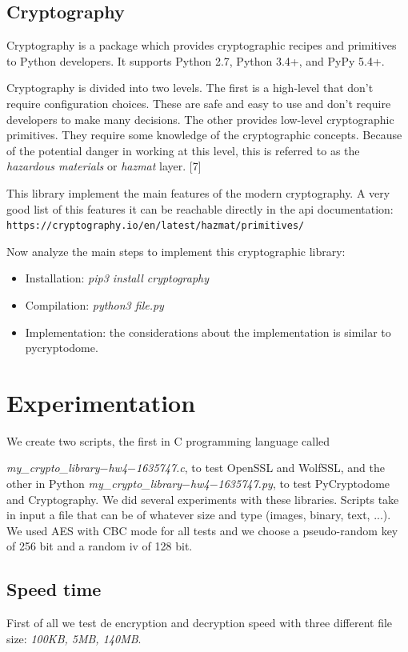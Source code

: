 \documentclass[11pt]{article}
\begin{document}
\subsection{Cryptography}
Cryptography is a package which provides cryptographic recipes and primitives to Python developers. It supports Python 2.7, Python 3.4+, and PyPy 5.4+.

Cryptography is divided into two levels. The first is a high-level that don't require configuration choices. These are safe and easy to use and don’t require developers to make many decisions. The other provides low-level cryptographic primitives. They require some knowledge of the cryptographic concepts. Because of the potential danger in working at this level, this is referred to as the {\em hazardous materials} or {\em hazmat} layer. [7]

This library implement the main features of the modern cryptography. A very good list of this features it can be reachable directly in the api documentation:\newline
\verb|https://cryptography.io/en/latest/hazmat/primitives/|

Now analyze the main steps to implement this cryptographic library:
\begin{itemize}
\item Installation: {\em pip3 install cryptography}
\item Compilation: {\em python3 file.py}
\item Implementation: the considerations about the implementation is similar to pycryptodome.
\end{itemize}

\section{Experimentation}
We create two scripts, the first in C programming language called

{\em my\_crypto\_library$-$hw4$-$1635747.c}, to test OpenSSL and WolfSSL, and the other in Python {\em my\_crypto\_library$-$hw4$-$1635747.py}, to test PyCryptodome and Cryptography. We did several experiments with these libraries. Scripts take in input a file that can be of whatever size and type (images, binary, text, ...). We used AES with CBC mode for all tests and we choose a pseudo-random key of 256 bit and a random iv of 128 bit.

\subsection{Speed time}
First of all we test de encryption and decryption speed with three different file size: {\em 100KB, 5MB, 140MB}.
\end{document}
